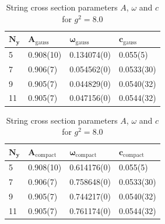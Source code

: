 \begin{table}[!hb]
\centering
\begin{tabular}{llll}
    $\mathbf{N_y}$ & $\mathbf{A_\mathrm{gauss}}$ & $\mathbf{\omega_\mathrm{gauss}}$ & $\mathbf{c_\mathrm{gauss}}$ \\ \hline
   5 & 0.908(10) & 0.134074(0) & 0.055(5) \\
   7 & 0.906(7) & 0.054562(0) & 0.0533(30) \\
   9 & 0.905(7) & 0.044829(0) & 0.0540(32) \\
   11 & 0.905(7) & 0.047156(0) & 0.0544(32) \\
\end{tabular}
\begin{tabular}{llll}
    $\mathbf{N_y}$ & $\mathbf{A_\mathrm{compact}}$ & $\mathbf{\omega_\mathrm{compact}}$ & $\mathbf{c_\mathrm{compact}}$ \\ \hline
   5 & 0.908(10) & 0.614176(0) & 0.055(5) \\
   7 & 0.906(7) & 0.758648(0) & 0.0533(30) \\
   9 & 0.905(7) & 0.744217(0) & 0.0540(32) \\
   11 & 0.905(7) & 0.761174(0) & 0.0544(32) \\
\end{tabular}
\caption{String cross section parameters $A$, $\omega$ and $c$ for $g^2=8.0$}
\end{table}
